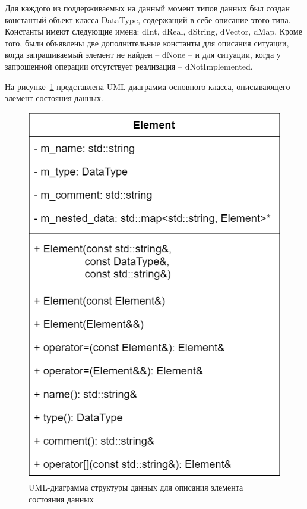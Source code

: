 Для каждого из поддерживаемых на данный момент типов данных был создан константый объект класса DataType, содержащий в себе описание этого типа. Константы имеют следующие имена: \textsf{dInt}, \textsf{dReal}, \textsf{dString}, \textsf{dVector}, \textsf{dMap}. Кроме того, были объявлены две дополнительные константы для описания ситуации, когда запрашиваемый элемент не найден -- \textsf{dNone} -- и для ситуации, когда у запрошенной операции отсутствует реализация -- \textsf{dNotImplemented}.

На рисунке~\ref{fig:UMLElement} представлена UML-диаграмма основного класса, описывающего элемент состояния данных.

\begin{figure}[!ht]
    \centering
    \includegraphics[height=0.33\textheight]{figures/UML.element.png}
    \caption{UML-диаграмма структуры данных для описания элемента состояния данных}
    \label{fig:UMLElement}
\end{figure}

